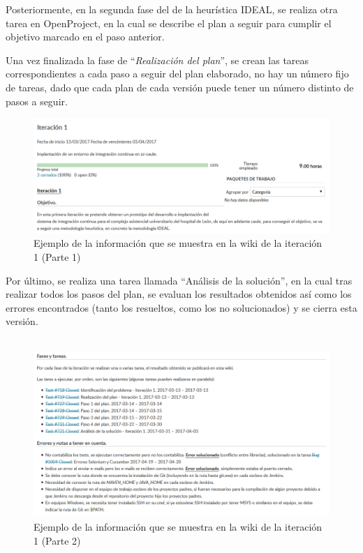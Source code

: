 Posteriormente, en la segunda fase del de la heurística IDEAL, se realiza otra tarea en OpenProject, en la cual se describe el plan a seguir para cumplir el objetivo marcado en el paso anterior.

Una vez finalizada la fase de ``\textit{Realización del plan}'', se crean las tareas correspondientes a cada paso a seguir del plan elaborado, no hay un número fijo de tareas, dado que cada plan de cada versión puede tener un número distinto de pasos a seguir.

\newpage

\begin{figure}[!h]
\centering
   \includegraphics[width=16cm]{Parte1_Wiki_It1.PNG}
\caption{Ejemplo de la información que se muestra en la wiki de la iteración 1 (Parte 1)}
\end{figure}

Por último, se realiza una tarea llamada ``Análisis de la solución'', en la cual tras realizar todos los pasos del plan, se evaluan los resultados obtenidos así como los errores encontrados (tanto los resueltos, como los no solucionados) y se cierra esta versión.\\ \\

\begin{figure}[!h]
\centering
   \includegraphics[width=16cm]{Parte_Wiki_It1.PNG}
\caption{Ejemplo de la información que se muestra en la wiki de la iteración 1 (Parte 2)}
\end{figure}


